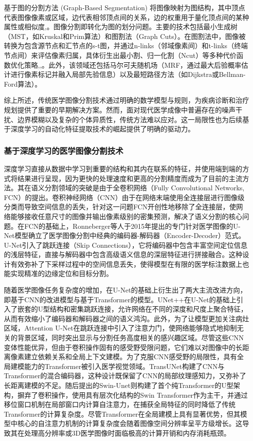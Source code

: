 \documentclass[12pt, a4paper, twoside]{article}
\begin{document}
基于图的分割方法 (Graph-Based Segmentation) 将图像映射为图结构，其中顶点代表图像像素或区域，边代表相邻顶点间的关系，边的权重用于量化顶点间的某种属性或相似度,。图像分割即转化为图的划分问题。主要的技术包括最小生成树（MST，如Kruskal和Prim算法）和图割法（Graph Cuts）。在图割法中，图像被转换为包含源节点和汇节点的s-t图，并通过n-links（邻域像素间）和t-links（终端节点间）来评估像素归属，具体衍生出最小割、归一化割（Ncut）等多种代价函数优化策略,,。此外，该领域还包括马尔可夫随机场（MRF，通过最大后验概率估计进行像素标记并融入局部先验信息）以及最短路径方法（如Dijkstra或Bellman-Ford算法）。

综上所述，传统医学图像分割技术通过明确的数学模型与规则，为疾病诊断和治疗规划提供了重要的早期解决方案。然而，面对现代医学成像中普遍存在的噪声干扰、边界模糊以及复杂的个体异质性，传统方法难以应对。这一局限性也为后续基于深度学习的自动化特征提取技术的崛起提供了明确的驱动力。

\subsubsection{基于深度学习的医学图像分割技术}

深度学习直接从数据中学习到重要的结构和其内在联系的特征，并使用端到端的方式将结果进行呈现，因为更快的处理速度和更高的分割精度而成为了目前的主流方法。其在语义分割领域的突破是由于全卷积网络（Fully Convolutional Networks, FCN）的提出。卷积神经网络（CNN）由于在网络末端使用全连接层进行图像级分类而导致空间信息的丢失，针对这一问题FCN开创性地移除了全连接层，使网络能够接收任意尺寸的图像并输出像素级别的密集预测，解决了语义分割的核心问题。在FCN的基础上，Ronneberger等人于2015年提出的专门针对医学图像的U-Net模型确立了医学图像分割中经典的编码器-解码器（Encoder-Decoder）范式。U-Net引入了跳跃连接（Skip Connections），它将编码器中包含丰富空间定位信息的浅层特征，直接与解码器中包含高级语义信息的深层特征进行拼接融合。这种设计有效弥补了下采样过程中的空间信息丢失，使得模型在有限的医学标注数据上也能实现精准的边缘定位和目标分割。

随着医学图像任务复杂度的增加，在U-Net的基础上衍生出了两大主流改进方向，即基于CNN的改进模型与基于Transformer的模型。UNet++在U-Net的基础上引入了嵌套的U型结构和密集跳跃连接，允许网络在不同的深度和尺度上聚合特征，从而有效缩小了编码器和解码器之间的语义鸿沟。此外，为了让模型更加关注病灶区域，Attention U-Net在跳跃连接中引入了注意力门，使网络能够隐式地抑制无关的背景区域，同时突出显示与分割任务高度相关的感兴趣区域。尽管这些CNN变体性能优异，但由于卷积操作固有的感受野受限问题，它们难以对图像中的长距离像素建立依赖关系和全局上下文建模。为了克服CNN感受野的局限性，具有全局建模能力的Transformer被引入医学视觉领域。TransUNet构建了CNN与Transformer的混合编码器，这种设计既保留了CNN的局部纹理感知力，又弥补了长距离建模的不足。随后提出的Swin-Unet则构建了首个纯Transformer的U型架构，摒弃了卷积操作，使用具有层次化结构的Swin Transformer作为主干，并通过移位窗口机制在局部窗口内计算自注意力，在捕获全局特征的同时降低了传统Transformer的计算复杂度。尽管Transformer在全局建模上具有显著优势，但其模型中核心的自注意力机制的计算复杂度会随着图像空间分辨率呈平方级增长。这导致其在处理高分辨率或3D医学图像时面临极高的计算开销和内存消耗瓶颈。
\end{document}
